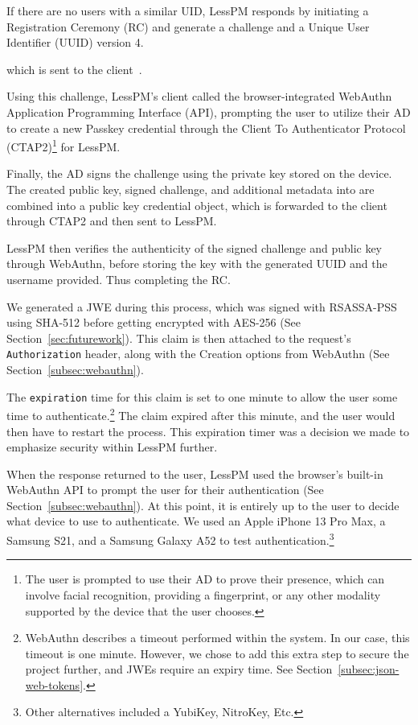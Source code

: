 If there are no users with a similar UID, LessPM responds by initiating a
Registration Ceremony (RC) and generate a challenge and a Unique User
Identifier (UUID) version 4.

which is sent to the client~\cite{webauthn-2}.

Using this challenge, LessPM's client called the browser-integrated WebAuthn
Application Programming Interface (API), prompting the user to utilize their
AD to create a new Passkey credential through the Client To Authenticator
Protocol (CTAP2)\footnote{
  The user is prompted to use their AD to prove their presence, which can
  involve facial recognition, providing a fingerprint, or any other modality
  supported by the device that the user chooses.
} for LessPM\@.

Finally, the AD signs the challenge using the private key stored on the
device.
The created public key, signed challenge, and additional metadata
into are combined into a public key credential object, which is forwarded
to the client through CTAP2 and then sent to LessPM\@.

LessPM then verifies the authenticity of the signed challenge and public key
through WebAuthn, before storing the key with the generated UUID and the
username provided.
Thus completing the RC\@.


We generated a JWE during this process, which was signed with RSASSA-PSS using
SHA-512 before getting encrypted with AES-256
(See Section~\ref{sec:futurework}).
This claim is then attached to the request's \texttt{Authorization} header,
along with the Creation options from WebAuthn
(See Section~\ref{subsec:webauthn}).

The \texttt{expiration} time for this claim is set to one minute to allow the
user some time to authenticate.\footnote{
  WebAuthn describes a timeout performed within the system. In our case, this
  timeout is one minute.
  However, we chose to add this extra step to secure the project further, and JWEs require an expiry time. See Section~\ref{subsec:json-web-tokens}.
}
The claim expired after this minute, and the user would then have to restart the
process.
This expiration timer was a decision we made to emphasize security within LessPM
further.

When the response returned to the user, LessPM used the browser's built-in
WebAuthn API to prompt the user for their authentication
(See Section~\ref{subsec:webauthn}).
At this point, it is entirely up to the user to decide what device to use to
authenticate.
We used an Apple iPhone 13 Pro Max, a Samsung S21, and a Samsung Galaxy A52 to
test authentication.\footnote{
  Other alternatives included a YubiKey, NitroKey, Etc.
}

